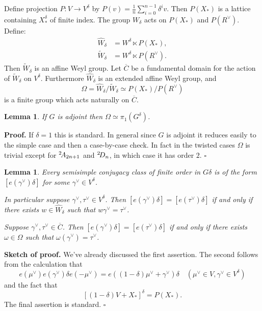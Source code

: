 \documentclass[10pt,leqno]{article}
\newtheorem{lemma}[equation]{Lemma}
\newcommand{\qed}{\hfill $\square$ \medskip}
\newenvironment{proof}[1][Proof]{\noindent\textbf{#1.} }{\qed}
\newcommand{\ch}[1]{#1^\vee}
\newcommand\wt{\widetilde}
\newcommand\wh{\widehat}
\newcommand{\twoAodd}{\phantom{}^2\negthinspace A_{2n+1}}
\newcommand{\twoD}{\phantom{}^2\negthinspace D_{n}}
\begin{document}
Define projection $P:V\rightarrow V^\delta$ by
$P(v)=\frac1n \sum_{i=0}^{n-1}\delta^iv$.
Then $P(X_*)$ is a lattice containing $X_*^\delta$ of finite index.
The group $W_\delta$ acts on $P(X_*)$ and $P(\ch R)$. Define:
\begin{equation}
\label{e:affine}
\begin{aligned}
\wh W_\delta&=W^\delta\ltimes P(X_*), \\
\wt W_\delta&=W^\delta\ltimes P(\ch R).
\end{aligned}
\end{equation}
Then $\wt W_\delta$ is an affine Weyl group. Let $\overline C$ be a
fundamental domain for the action of $\wt W_\delta$ on $V^\delta$.
Furthermore
$\wh W_\delta$ is an extended affine Weyl group, and
$$
\Omega=\wh W_\delta/\wt W_\delta\simeq P(X_*)/P(\ch R)
$$
is a finite group which acts naturally on $\overline C$.

\begin{lemma}
\label{l:Omega}
If $G$ is adjoint then $\Omega\simeq \pi_1(G^\delta)$.
\end{lemma}

\begin{proof}
If $\delta=1$ this is standard. In general since $G$ is adjoint it
reduces easily to the simple case and then a case-by-case check. In
fact in the twisted cases $\Omega$ is trivial except for $\twoAodd$ and $\twoD$, in which case it has order $2$.
\end{proof}



\begin{lemma}
\label{l:kac1}
Every semisimple conjugacy class of finite order in $G\delta$ is of
the form $[e(\ch\gamma)\delta]$ for some $\ch\gamma\in V^\delta$.
  
In particular suppose $\ch\gamma,\ch\tau\in V^\delta$.  Then $[e(\ch\gamma)\delta]=[e(\ch\tau)\delta]$ if and only if there exists $w\in \wh W_\delta$
such that $w\ch\gamma=\ch\tau$.

Suppose $\ch\gamma,\ch\tau\in \overline C$. Then
$[e(\ch\gamma)\delta]=[e(\ch\tau)\delta]$ if and only if there exists
$\omega\in \Omega$ such that $\omega(\ch\gamma)=\ch\tau$.

\end{lemma}

\begin{proof}[Sketch of proof]
We've already discussed the first assertion. The second follows from
the calculation that
$$
e(\ch\mu)e(\ch\gamma)\delta e(-\ch\mu)=e((1-\delta)\ch\mu+\ch\gamma)\delta\quad (\ch\mu\in V,\ch\gamma\in V^\delta)
$$
and the fact that
$$
[(1-\delta)V+X_*]^\delta=P(X_*).
$$
The final assertion is standard.
\end{proof}
\end{document}
